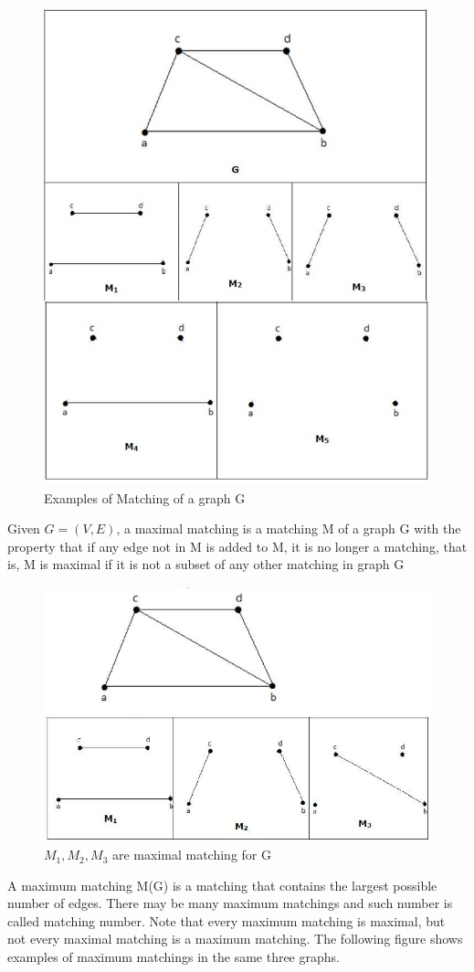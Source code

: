 \begin{figure}[htbp]
\centering
\includegraphics[width=.55\textwidth]{matching.png}
\caption{Examples of Matching of a graph G}
\end{figure}

\begin{definition}
Given $G = (V,E)$, a maximal matching is a matching M of a graph G with the property that if any edge not in M is added to M, it is no longer a matching, that is, M is maximal if it is not a subset of any other matching in graph G
\end{definition}

\begin{figure}[htbp]
\centering
\includegraphics[width=.60\textwidth]{maximal.png}
\caption{$M_{1},M_{2},M_{3}$ are maximal matching for G}
\end{figure}

\begin{definition}
A maximum matching M(G) is a matching that contains the largest possible number of edges. There may be many maximum matchings and such number is called matching number. Note that every maximum matching is maximal, but not every maximal matching is a maximum matching. The following figure shows examples of maximum matchings in the same three graphs.
\end{definition}

